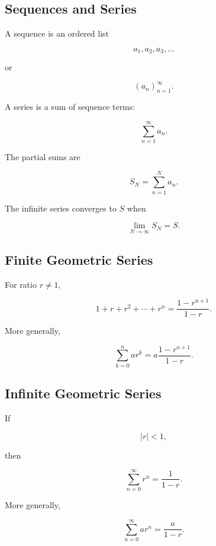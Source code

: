 \subsection{Sequences and Series}
\label{subsec:sequences-series-reference}

A sequence is an ordered list

\[
\boxed{
a_1,a_2,a_3,\ldots
}
\]

or

\[
\boxed{
(a_n)_{n=1}^{\infty}.
}
\]

A series is a sum of sequence terms:

\[
\boxed{
\sum_{n=1}^{\infty}a_n.
}
\]

The partial sums are

\[
\boxed{
S_N
=
\sum_{n=1}^{N}a_n.
}
\]

The infinite series converges to \(S\) when

\[
\boxed{
\lim_{N\to\infty}S_N=S.
}
\]

\subsection{Finite Geometric Series}
\label{subsec:finite-geometric-series-reference}

For ratio \(r\neq1\),

\[
\boxed{
1+r+r^2+\cdots+r^{n}
=
\frac{1-r^{n+1}}{1-r}.
}
\]

More generally,

\[
\boxed{
\sum_{k=0}^{n}ar^k
=
a
\frac{1-r^{n+1}}{1-r}.
}
\]

\subsection{Infinite Geometric Series}
\label{subsec:infinite-geometric-series-expansions}

If

\[
|r|<1,
\]

then

\[
\boxed{
\sum_{n=0}^{\infty}r^n
=
\frac{1}{1-r}.
}
\]

More generally,

\[
\boxed{
\sum_{n=0}^{\infty}ar^n
=
\frac{a}{1-r}.
}
\]

